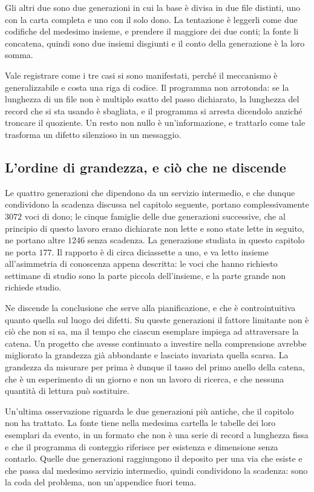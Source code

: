 Gli altri due sono due generazioni in cui la base è divisa in due file distinti, uno con la carta completa e uno con il solo dono. La tentazione è leggerli come due codifiche del medesimo insieme, e prendere il maggiore dei due conti; la fonte li concatena, quindi sono due insiemi disgiunti e il conto della generazione è la loro somma.

Vale registrare come i tre casi si sono manifestati, perché il meccanismo è generalizzabile e costa una riga di codice. Il programma non arrotonda: se la lunghezza di un file non è multiplo esatto del passo dichiarato, la lunghezza del record che si sta usando è sbagliata, e il programma si arresta dicendolo anziché troncare il quoziente. Un resto non nullo è un'informazione, e trattarlo come tale trasforma un difetto silenzioso in un messaggio.

\subsection*{L'ordine di grandezza, e ciò che ne discende}

Le quattro generazioni che dipendono da un servizio intermedio, e che dunque condividono la scadenza discussa nel capitolo seguente, portano complessivamente $3072$ voci di dono; le cinque famiglie delle due generazioni successive, che al principio di questo lavoro erano dichiarate non lette e sono state lette in seguito, ne portano altre $1246$ senza scadenza. La generazione studiata in questo capitolo ne porta $177$. Il rapporto è di circa diciassette a uno, e va letto insieme all'asimmetria di conoscenza appena descritta: le voci che hanno richiesto settimane di studio sono la parte piccola dell'insieme, e la parte grande non richiede studio.

Ne discende la conclusione che serve alla pianificazione, e che è controintuitiva quanto quella sul luogo dei difetti. Su queste generazioni il fattore limitante non è ciò che non si sa, ma il tempo che ciascun esemplare impiega ad attraversare la catena. Un progetto che avesse continuato a investire nella comprensione avrebbe migliorato la grandezza già abbondante e lasciato invariata quella scarsa. La grandezza da misurare per prima è dunque il tasso del primo anello della catena, che è un esperimento di un giorno e non un lavoro di ricerca, e che nessuna quantità di lettura può sostituire.

Un'ultima osservazione riguarda le due generazioni più antiche, che il capitolo non ha trattato. La fonte tiene nella medesima cartella le tabelle dei loro esemplari da evento, in un formato che non è una serie di record a lunghezza fissa e che il programma di conteggio riferisce per esistenza e dimensione senza contarlo. Quelle due generazioni raggiungono il deposito per una via che esiste e che passa dal medesimo servizio intermedio, quindi condividono la scadenza: sono la coda del problema, non un'appendice fuori tema.


